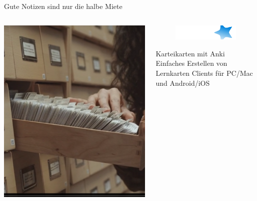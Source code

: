 \documentclass[aspectratio=169,shownotes]{beamer}
\begin{document}
\begin{frame}{Gute Notizen sind nur die halbe Miete}
    \begin{columns}
        \begin{column}{0.4\textwidth}
            \includegraphics[width=\textwidth]{graphics/Zettelkasten.png}
        \end{column}
        \begin{column}[t]{0.6\textwidth} 
            \vspace{-4cm}
            \begin{figure}[h]
                \includegraphics[width=\textwidth]{graphics/Logos/anki.png}
            \end{figure}  
            \begin{block}{Karteikarten mit Anki}
                Einfaches Erstellen von Lernkarten
                Clients für PC/Mac und Android/iOS
                
            \end{block}                     
        \end{column}        
    \end{columns}    
\end{frame}
\end{document}
